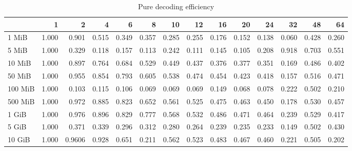 \begin{centering}
\begin{table}[!h]
	\caption{Pure decoding efficiency}
	\begin{tabular}{lrrrrrrrrrrrrr}
		\toprule
		\diagbox[width=7em]{Sizes}{Threads} & 1  &    2  &    4  &    6  &    8  &    10 &    12 &    16 &    20 &    24 &    32 &    48 &    64 \\
		\midrule
		1 MiB   & 1.000 & 0.901 & 0.515 & 0.349 & 0.357 & 0.285 & 0.255 & 0.176 & 0.152 & 0.138 & 0.060 & 0.428 & 0.260 \\
		5 MiB   & 1.000 & 0.329 & 0.118 & 0.157 & 0.113 & 0.242 & 0.111 & 0.145 & 0.105 & 0.208 & 0.918 & 0.703 & 0.551 \\
		10 MiB  & 1.000 & 0.897 & 0.764 & 0.684 & 0.529 & 0.449 & 0.437 & 0.376 & 0.377 & 0.351 & 0.169 & 0.486 & 0.402 \\
		50 MiB  & 1.000 & 0.955 & 0.854 & 0.793 & 0.605 & 0.538 & 0.474 & 0.454 & 0.423 & 0.418 & 0.157 & 0.516 & 0.471 \\
		100 MiB & 1.000 & 0.103 & 0.115 & 0.106 & 0.069 & 0.069 & 0.069 & 0.149 & 0.068 & 0.078 & 0.222 & 0.502 & 0.210 \\
		500 MiB & 1.000 & 0.972 & 0.885 & 0.823 & 0.652 & 0.561 & 0.525 & 0.475 & 0.463 & 0.450 & 0.178 & 0.530 & 0.457 \\
		1 GiB   & 1.000 & 0.976 & 0.896 & 0.829 & 0.777 & 0.568 & 0.532 & 0.486 & 0.471 & 0.464 & 0.239 & 0.529 & 0.417 \\
		5 GiB   & 1.000 & 0.371 & 0.339 & 0.296 & 0.312 & 0.280 & 0.264 & 0.239 & 0.235 & 0.233 & 0.149 & 0.502 & 0.430 \\
		10 GiB  & 1.000 & 0.9606 & 0.928 & 0.651 & 0.211 & 0.562 & 0.523 & 0.483 & 0.467 & 0.460 & 0.221 & 0.505 & 0.202 \\
		\bottomrule
	\end{tabular}
\end{table}
\end{centering}